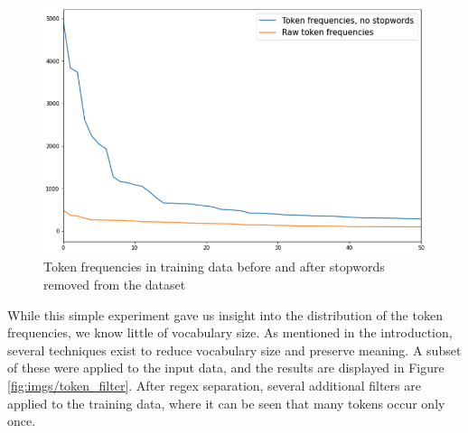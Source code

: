 \documentclass[11pt,a4paper]{article}
\begin{document}
\begin{figure}[htpb]
  \centering
  \includegraphics[width=1\linewidth]{imgs/stopwords.png}
  \caption{Token frequencies in training data before and after 
  stopwords removed from the dataset}%
  \label{fig:stopwords}
  \vspace{-10pt}
\end{figure}

While this simple experiment gave us insight into the distribution of the token frequencies, we know little of vocabulary size. As mentioned in the introduction, several techniques exist to reduce vocabulary size and preserve meaning. A subset of these were applied to the input data, and the results are displayed in Figure \ref{fig:imgs/token_filter}. After regex separation, several additional filters are applied to the training data, where it can be seen that many tokens occur only once.
\end{document}
